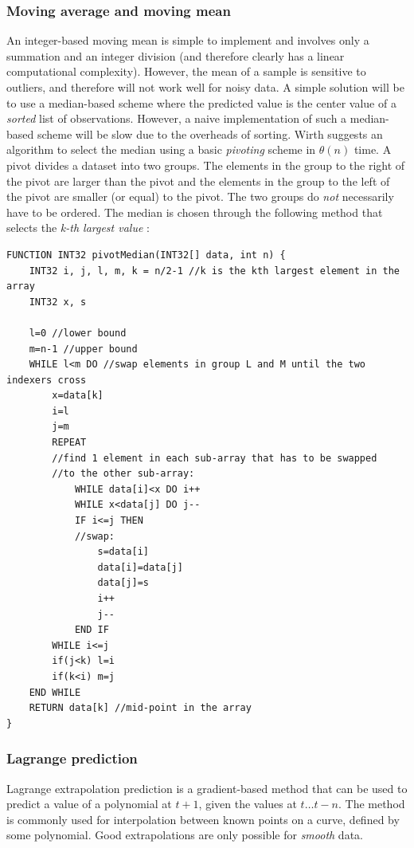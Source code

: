  \subsubsection{Moving average and moving mean}
  An integer-based moving mean is simple to implement and involves only a summation and an integer division (and therefore clearly has a linear computational complexity).
  However, the mean of a sample is sensitive to outliers, and therefore will not work well for noisy data. A simple solution will be to use a median-based scheme
  where the predicted value is the center value of a \textit{sorted} list of observations. However, a naive implementation of such a median-based scheme will
  be slow due to the overheads of sorting. Wirth suggests an algorithm \cite{wirth76} to select the median using a basic \textit{pivoting} scheme in $\theta(n)$
  time. A pivot divides a dataset into two groups. The elements in the group to the right of the pivot are larger than the pivot and the elements in the group to
  the left of the pivot are smaller (or equal) to the pivot. The two groups do \emph{not} necessarily have to be ordered. The median is chosen through the following
  method that selects the \textit{k-th largest value} \cite{wirth76}:
  \begin{verbatim}
FUNCTION INT32 pivotMedian(INT32[] data, int n) {
    INT32 i, j, l, m, k = n/2-1 //k is the kth largest element in the array
    INT32 x, s

    l=0 //lower bound
    m=n-1 //upper bound
    WHILE l<m DO //swap elements in group L and M until the two indexers cross
        x=data[k]
        i=l
        j=m
        REPEAT
	    //find 1 element in each sub-array that has to be swapped
	    //to the other sub-array:
            WHILE data[i]<x DO i++
            WHILE x<data[j] DO j--
            IF i<=j THEN
		    //swap:
                s=data[i]
                data[i]=data[j]
                data[j]=s
                i++
                j--
            END IF
        WHILE i<=j
        if(j<k) l=i
        if(k<i) m=j
    END WHILE
    RETURN data[k] //mid-point in the array
}
  \end{verbatim}
 \subsubsection{Lagrange prediction}
  Lagrange extrapolation prediction is a gradient-based method that can be used to predict a value of a polynomial at $t+1$, given the values at $t\dots t-n$.
  The method is commonly used for interpolation between known points on a curve, defined by some polynomial. Good extrapolations are only possible for 
  \textit{smooth} data.
  
